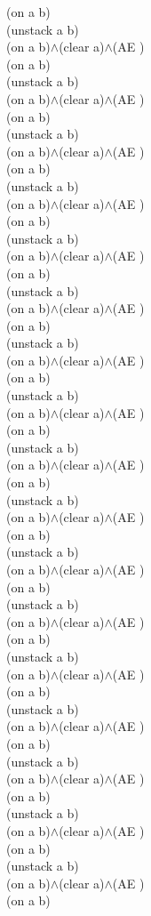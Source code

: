 {{(on a b)\\
(unstack a b)\\
(on a b)$\wedge$(clear a)$\wedge$(AE )\\
(on a b)\\
(unstack a b)\\
(on a b)$\wedge$(clear a)$\wedge$(AE )\\
(on a b)\\
(unstack a b)\\
(on a b)$\wedge$(clear a)$\wedge$(AE )\\
(on a b)\\
(unstack a b)\\
(on a b)$\wedge$(clear a)$\wedge$(AE )\\
(on a b)\\
(unstack a b)\\
(on a b)$\wedge$(clear a)$\wedge$(AE )\\
(on a b)\\
(unstack a b)\\
(on a b)$\wedge$(clear a)$\wedge$(AE )\\
(on a b)\\
(unstack a b)\\
(on a b)$\wedge$(clear a)$\wedge$(AE )\\
(on a b)\\
(unstack a b)\\
(on a b)$\wedge$(clear a)$\wedge$(AE )\\
(on a b)\\
(unstack a b)\\
(on a b)$\wedge$(clear a)$\wedge$(AE )\\
(on a b)\\
(unstack a b)\\
(on a b)$\wedge$(clear a)$\wedge$(AE )\\
(on a b)\\
(unstack a b)\\
(on a b)$\wedge$(clear a)$\wedge$(AE )\\
(on a b)\\
(unstack a b)\\
(on a b)$\wedge$(clear a)$\wedge$(AE )\\
(on a b)\\
(unstack a b)\\
(on a b)$\wedge$(clear a)$\wedge$(AE )\\
(on a b)\\
(unstack a b)\\
(on a b)$\wedge$(clear a)$\wedge$(AE )\\
(on a b)\\
(unstack a b)\\
(on a b)$\wedge$(clear a)$\wedge$(AE )\\
(on a b)\\
(unstack a b)\\
(on a b)$\wedge$(clear a)$\wedge$(AE )\\
(on a b)\\
(unstack a b)\\
(on a b)$\wedge$(clear a)$\wedge$(AE )\\
(on a b)\\
}%
}

